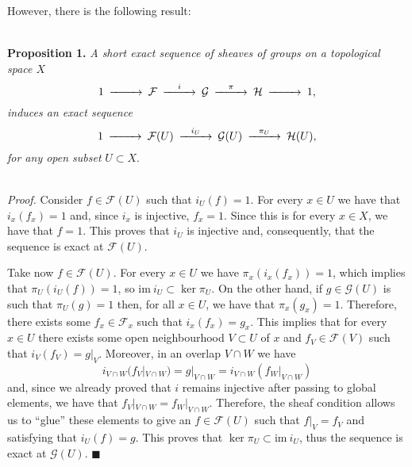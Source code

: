 \documentclass[12pt,a4paper]{article}
\begin{document}
    However, there is the following result:

    \ \\
    \textbf{Proposition 1.} \textit{A short exact sequence of sheaves of groups on a topological space $X$}
    \begin{equation*}
      \begin{CD}
1 @>>>	\mathcal{F} @> i >> \mathcal{G} @> \pi >> \mathcal{H} @>>> 1,
      \end{CD}
    \end{equation*}
    \textit{induces an exact sequence}
    \begin{equation*}
      \begin{CD}
1 @>>>	\mathcal{F}(U) @> i_U >> \mathcal{G}(U) @> \pi_U >> \mathcal{H}(U),
      \end{CD}
    \end{equation*}
    \textit{for any open subset} $U\subset X$.

    \ \\
    \textit{Proof.} Consider $f\in \mathcal{F}(U)$ such that $i_U(f)=1$. For every $x\in U$ we have that $i_x(f_x)=1$ and, since $i_x$ is injective, $f_x=1$. Since this is for every $x\in X$, we have that $f=1$. This proves that $i_U$ is injective and, consequently, that the sequence is exact at $\mathcal{F}(U)$.

    Take now $f\in \mathcal{F}(U)$. For every $x\in U$ we have $\pi_x(i_x(f_x))=1$, which implies that $\pi_U(i_U(f))=1$, so $\mathrm{im}\ i_U \subset \ker \pi_U$. On the other hand, if $g\in \mathcal{G}(U)$ is such that $\pi_U(g)=1$ then, for all $x\in U$, we have that $\pi_x(g_x)=1$. Therefore, there exists some $f_x \in \mathcal{F}_x$ such that $i_x(f_x)=g_x$. This implies that for every $x\in U$ there exists some open neighbourhood $V\subset U$ of $x$ and $f_V \in \mathcal{F}(V)$ such that $i_V(f_V)=g|_V$. Moreover, in an overlap $V\cap W$ we have
    \begin{equation*}
      i_{V\cap W}( f_V|_{V\cap W})= g|_{V\cap W} = i_{V\cap W}(f_W|_{V\cap W})
    \end{equation*}
    and, since we already proved that $i$ remains injective after passing to global elements, we have that $ f_V|_{V\cap W}=f_W|_{V\cap W}$. Therefore, the sheaf condition allows us to ``glue'' these elements to give an $f \in \mathcal{F}(U)$ such that $f|_V=f_V$ and satisfying that $i_U(f)=g$. This proves that $\ker \pi_U \subset \mathrm{im}\ i_U$, thus the sequence is exact at $\mathcal{G}(U)$. \hfill $\blacksquare$
    \ \\
\end{document}
